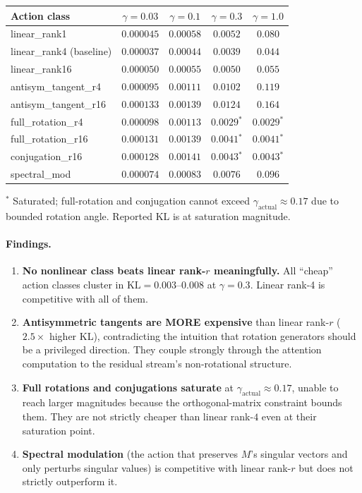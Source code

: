 \documentclass[11pt, a4paper]{article}
\theoremstyle{plain}
\theoremstyle{definition}
\theoremstyle{remark}
\begin{document}
\begin{center}
\small
\begin{tabular}{l c c c c}
\toprule
Action class & $\gamma=0.03$ & $\gamma=0.1$ & $\gamma=0.3$ & $\gamma=1.0$ \\
\midrule
linear\_rank1            & $0.000045$ & $0.00058$ & $0.0052$ & $0.080$ \\
linear\_rank4 (baseline) & $0.000037$ & $0.00044$ & $0.0039$ & $0.044$ \\
linear\_rank16           & $0.000050$ & $0.00055$ & $0.0050$ & $0.055$ \\
antisym\_tangent\_r4     & $0.000095$ & $0.00111$ & $0.0102$ & $0.119$ \\
antisym\_tangent\_r16    & $0.000133$ & $0.00139$ & $0.0124$ & $0.164$ \\
full\_rotation\_r4       & $0.000098$ & $0.00113$ & $0.0029$$^*$ & $0.0029$$^*$ \\
full\_rotation\_r16      & $0.000131$ & $0.00139$ & $0.0041$$^*$ & $0.0041$$^*$ \\
conjugation\_r16         & $0.000128$ & $0.00141$ & $0.0043$$^*$ & $0.0043$$^*$ \\
spectral\_mod            & $0.000074$ & $0.00083$ & $0.0076$ & $0.096$ \\
\bottomrule
\end{tabular}
\end{center}
\noindent\small{$^*$ Saturated; full-rotation and conjugation cannot exceed $\gamma_{\text{actual}} \approx 0.17$ due to bounded rotation angle. Reported KL is at saturation magnitude.}

\paragraph{Findings.}
\begin{enumerate}[nosep]
\item \textbf{No nonlinear class beats linear rank-$r$ meaningfully.} All ``cheap'' action classes cluster in $\mathrm{KL} = 0.003$--$0.008$ at $\gamma = 0.3$. Linear rank-4 is competitive with all of them.
\item \textbf{Antisymmetric tangents are MORE expensive} than linear rank-$r$ ($2.5\times$ higher KL), contradicting the intuition that rotation generators should be a privileged direction. They couple strongly through the attention computation to the residual stream's non-rotational structure.
\item \textbf{Full rotations and conjugations saturate} at $\gamma_{\text{actual}} \approx 0.17$, unable to reach larger magnitudes because the orthogonal-matrix constraint bounds them. They are not strictly cheaper than linear rank-$4$ even at their saturation point.
\item \textbf{Spectral modulation} (the action that preserves $M$'s singular vectors and only perturbs singular values) is competitive with linear rank-$r$ but does not strictly outperform it.
\end{enumerate}
\end{document}
